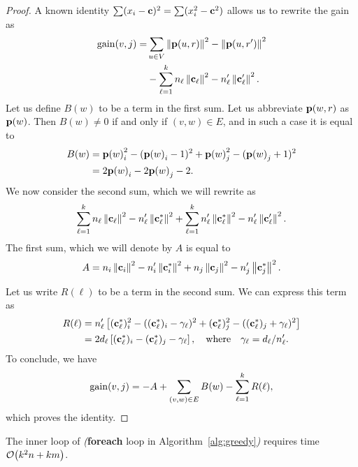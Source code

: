 \begin{proof}
A known identity $\sum (x_i - \mathbf{c})^2 = \sum (x_i^2 - \mathbf{c}^2)$ allows us to 
rewrite the gain as
\[
\begin{split}
	\gain{v, j} = & \sum_{u \in V} \norm{\prof{u, \role}}^2 -  \norm{\prof{u, \role'}}^2 \\
	& - \sum_{\ell = 1}^k n_\ell \norm{\centroid_\ell}^2 -  n_\ell' \norm{\centroid_\ell'}^2.
\end{split}
\]
Let us define $B(w)$ to be a term in the first sum.
Let us abbreviate $\prof{w, \role}$ as $\prof{w}$.
Then $B(w) \neq 0$ if and only if $(v, w) \in E$,
and in such a case it is equal to
\[
\begin{split}
	B(w) & = \prof{w}_i^2 - (\prof{w}_i - 1)^2 + \prof{w}_j^2 - (\prof{w}_j + 1)^2 \\
	& = 2\prof{w}_i - 2\prof{w}_j  - 2.
\end{split}
\]
We now consider the second sum, which we will rewrite as
\[
	\sum_{\ell = 1}^k n_\ell \left\|\mathbf{c}_\ell\right\|^2 -  n_\ell' \left\|\mathbf{c}_\ell^*\right\|^2 +
	\sum_{\ell = 1}^k n_\ell' \left\|\mathbf{c}_\ell^*\right\|^2 -  n_\ell' \left\|\mathbf{c}_\ell'\right\|^2.
\]
The first sum, which we will denote by $A$ is equal to
\[
	A = n_i\left\|\mathbf{c}_i\right\|^2 - n_i'\left\|\mathbf{c}_i^*\right\|^2 + n_j\left\|\mathbf{c}_j\right\|^2 - n_j'\left\|\mathbf{c}_j^*\right\|^2. 
\]

Let us write $R(\ell)$ to be a term in the second sum. We can express this term as
\[
\begin{split}
	R(\ell) & = n_\ell'\left[(\mathbf{c}_\ell^*)_i^2 - ((\mathbf{c}_\ell^*)_i - \gamma_\ell)^2 + (\mathbf{c}_\ell^*)_j^2 - ((\mathbf{c}_\ell^*)_j +  \gamma_\ell)^2\right] \\
	        & = 2d_\ell \left[(\mathbf{c}_\ell^*)_i - (\mathbf{c}_\ell^*)_j -  \gamma_\ell\right], \quad \text{where} \quad \gamma_\ell = d_\ell / n_\ell'.
\end{split}
\]
To conclude, we have
\[
	\gain{v, j} = - A + \sum_{(v, w) \in E} B(w) - \sum_{\ell = 1}^k R(\ell),
\]
which proves the identity.
\end{proof}
\fi



\begin{proposition}
The inner loop of \alggreedy
\emph{(}{\bf foreach} loop in Algorithm~\ref{alg:greedy}\emph{)} 
requires time $\bigO{k^2 n + km}$.
\label{prop:greedytime}
\end{proposition}

\iffalse
\begin{proof}
According to Proposition~\ref{prop:fastgain}, computing the gain can be done in time $\bigO{k + \dg{v}}$. 
Consequently, computing $j^*$ requires time $\bigO{k^2 + k\dg{v}}$. 
Updating the profiles, the centroids, and the role assignment $\role$
can be done in time $\bigO{k + \dg{v}}$. 
Summing over all the vertices gives us a total running time of $\bigO{k^2 n + km}$.
\end{proof}
\fi
